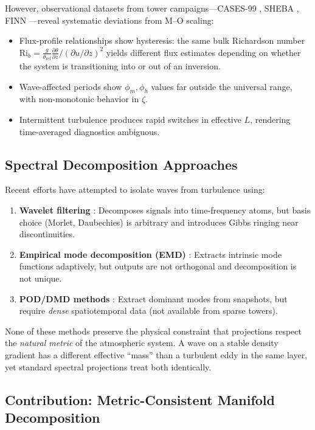 \documentclass[11pt,a4paper]{article}
\begin{document}
However, observational datasets from tower campaigns---CASES-99 \citep{Poulos2002}, SHEBA \citep{Uttal2002}, FINN \citep{Mahrt2013}---reveal systematic deviations from M--O scaling:
\begin{itemize}
  \item Flux-profile relationships show hysteresis: the same bulk Richardson number $\mathrm{Ri}_b = \frac{g}{\theta_{\mathrm{ref}}} \frac{\partial \theta}{\partial z} / (\partial u / \partial z)^2$ yields different flux estimates depending on whether the system is transitioning into or out of an inversion.
  \item Wave-affected periods show $\phi_m, \phi_h$ values far outside the universal range, with non-monotonic behavior in $\zeta$.
  \item Intermittent turbulence produces rapid switches in effective $L$, rendering time-averaged diagnostics ambiguous.
\end{itemize}

\subsection{Spectral Decomposition Approaches}

Recent efforts have attempted to isolate waves from turbulence using:
\begin{enumerate}
  \item \textbf{Wavelet filtering} \citep{Vosper2006, Sun2015}: Decomposes signals into time-frequency atoms, but basis choice (Morlet, Daubechies) is arbitrary and introduces Gibbs ringing near discontinuities.
  \item \textbf{Empirical mode decomposition (EMD)} \citep{Huang2009}: Extracts intrinsic mode functions adaptively, but outputs are not orthogonal and decomposition is not unique.
  \item \textbf{POD/DMD methods} \citep{Schmid2010}: Extract dominant modes from snapshots, but require \emph{dense} spatiotemporal data (not available from sparse towers).
\end{enumerate}

None of these methods preserve the physical constraint that projections respect the \emph{natural metric} of the atmospheric system. A wave on a stable density gradient has a different effective ``mass'' than a turbulent eddy in the same layer, yet standard spectral projections treat both identically.

\subsection{Contribution: Metric-Consistent Manifold Decomposition}
\end{document}
